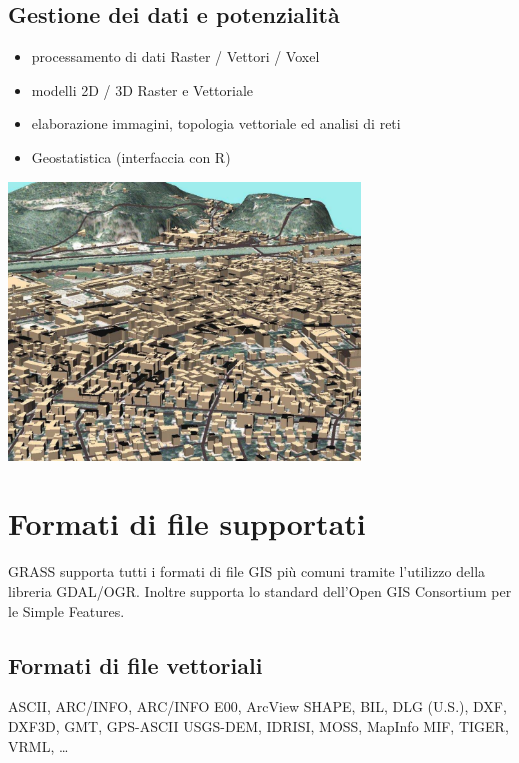 \documentclass[notumble,a4paper,10pt,nofoldmark]{leaflet}
\newenvironment{myfig}[1][0pt plus 1.5ex minus .5ex]{\par\vspace*{#1}\begin{minipage}{\textwidth}\centering}{\end{minipage}}
\begin{document}
\subsection{Gestione dei dati e potenzialit\`a}

\begin{itemize}
\item processamento di dati Raster / Vettori / Voxel
\item modelli 2D / 3D Raster e Vettoriale 
\item elaborazione immagini, topologia vettoriale ed analisi di reti
\item Geostatistica (interfaccia con R)
\end{itemize}

\begin{myfig}[1ex]
\includegraphics[width=0.7\textwidth]{trento3d}
\end{myfig}

\section{Formati di file supportati}

GRASS supporta tutti i formati di file GIS pi\`u comuni tramite l'utilizzo della libreria GDAL/OGR. Inoltre  supporta lo standard dell'Open GIS Consortium per le Simple Features.

\subsection{Formati di file vettoriali}
ASCII, ARC/INFO, ARC/INFO E00, Arc\-View SHAPE, BIL, DLG (U.S.), DXF, DXF3D, GMT, GPS-ASCII USGS-DEM, IDRISI, MOSS, MapInfo MIF, TIGER, VRML, \dots
\end{document}
